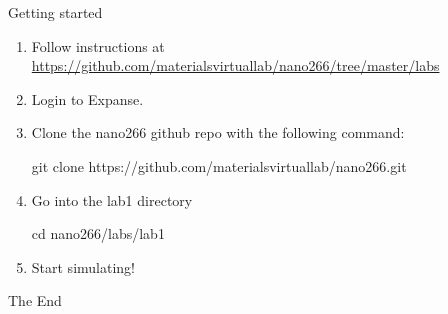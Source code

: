 \documentclass[aspectratio=169]{beamer}
\begin{document}
\begin{frame}{Getting started}
\begin{enumerate}
    \item Follow instructions at \url{https://github.com/materialsvirtuallab/nano266/tree/master/labs}
    \item Login to Expanse.
    \item Clone the nano266 github repo with the following command:

       git clone https://github.com/materialsvirtuallab/nano266.git 

    \item Go into the lab1 directory

       cd nano266/labs/lab1

    \item Start simulating!

\end{enumerate}
\end{frame} 


%     
%     



\begin{frame}
    \Huge{\centerline{The End}}
\end{frame}
\end{document}
